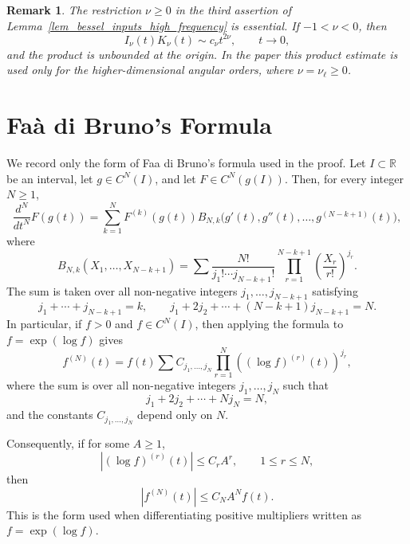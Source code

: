 \documentclass[12pt]{amsart}
\newtheorem{remark}[theorem]{Remark}
\begin{document}
\begin{remark}
The restriction $\nu\geq0$ in the third assertion of  Lemma~\ref{lem_bessel_inputs_high_frequency}
is essential. If $-1<\nu<0$, then
\[
    I_\nu(t)K_\nu(t)\sim c_\nu t^{2\nu},
    \qquad t\to 0,
\]
and the product is unbounded at the origin. In the paper this product estimate is used only for the higher-dimensional angular orders, where $\nu=\nu_\ell\geq0$. 
\end{remark}





\section{Fa\`a di Bruno's Formula}


We record only the form of Faa di Bruno's formula used in the proof. Let
$I\subset\mathbb R$ be an interval, let $g\in C^N(I)$, and let
$F\in C^N(g(I))$. Then, for every integer $N\geq1$,
\[
    \frac{d^N}{dt^N}F(g(t))
    =
    \sum_{k=1}^N
    F^{(k)}(g(t))
    B_{N,k}\bigl(g'(t),g''(t),\ldots,g^{(N-k+1)}(t)\bigr),
\]
where
\[
    B_{N,k}(X_1,\ldots,X_{N-k+1})
    =
    \sum
    \frac{N!}{j_1!\cdots j_{N-k+1}!}
    \prod_{r=1}^{N-k+1}
    \left(\frac{X_r}{r!}\right)^{j_r}.
\]
The sum is taken over all non-negative integers
$j_1,\ldots,j_{N-k+1}$ satisfying
\[
    j_1+\cdots+j_{N-k+1}=k,
    \qquad
    j_1+2j_2+\cdots+(N-k+1)j_{N-k+1}=N.
\]
In particular, if $f>0$ and $f\in C^N(I)$, then applying the formula to
$f=\exp(\log f)$ gives
\[
    f^{(N)}(t)
    =
    f(t)
    \sum
    C_{j_1,\ldots,j_N}
    \prod_{r=1}^N
    \left((\log f)^{(r)}(t)\right)^{j_r},
\]
where the sum is over all non-negative integers $j_1,\ldots,j_N$ such that
\[
    j_1+2j_2+\cdots+Nj_N=N,
\]
and the constants $C_{j_1,\ldots,j_N}$ depend only on $N$.

Consequently, if for some $A\geq1$,
\[
    \left|(\log f)^{(r)}(t)\right|
    \leq
    C_r A^r,
    \qquad
    1\leq r\leq N,
\]
then
\[
    |f^{(N)}(t)|
    \leq
    C_N A^N f(t).
\]
This is the form used when differentiating positive multipliers written as
$f=\exp(\log f)$.







\end{document}
